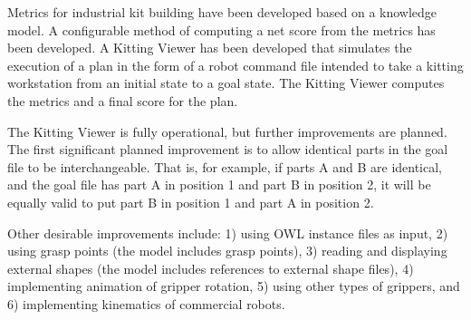 Metrics for industrial kit building have been developed based on a
knowledge model. A configurable method of computing a net score from the
metrics has been developed. A Kitting Viewer has been developed that
simulates the execution of a plan in the form of a robot command file
intended to take a kitting workstation from an initial state to a goal
state. The Kitting Viewer computes the metrics and a final score for the
plan.

The Kitting Viewer is fully operational, but further improvements are
planned. The first significant planned improvement is to allow identical
parts in the goal file to be interchangeable. That is, for example, if
parts A and B are identical, and the goal file has part A in position 1 and
part B in position 2, it will be equally valid to put part B in position 1
and part A in position 2.

Other desirable improvements include: 1) using OWL instance files as input, 2) using grasp points (the model includes grasp points), 3) reading and displaying external shapes (the model includes references to external shape files), 4) implementing animation of gripper rotation, 5) using other types of grippers, and 6) implementing kinematics of commercial robots.
% 
% 
% 
% 
% 
% 
% 
% 
